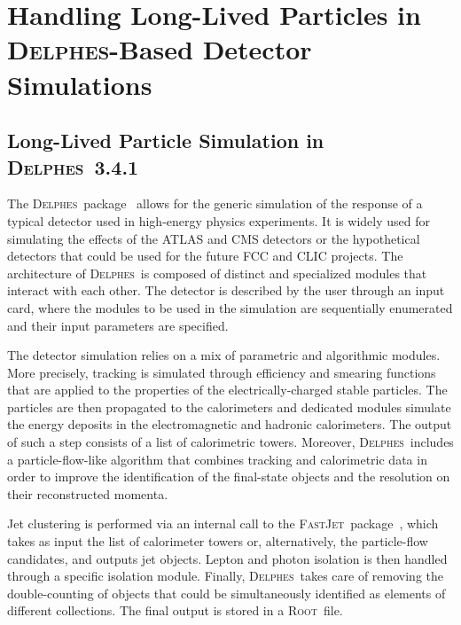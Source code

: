 
\newcommand{\MG}{\textsc{MadGraph}~5\_aMC@NLO}
\newcommand{\PY}{\textsc{Pythia}~8}
\newcommand{\MA}{\textsc{MadAnalysis}~5}
\newcommand{\MW}{\textsc{MadWidth}}
\newcommand{\MAnorm}{{MadAnalysis}~5}
\newcommand{\FJ}{\textsc{FastJet}}
\newcommand{\DEL}{\textsc{Delphes}}
\newcommand{\ROOT}{\textsc{Root}}

\section{Handling Long-Lived Particles in \DEL-Based Detector Simulations}
\label{sec:ch5-recastingDelphes}

\subsection{Long-Lived Particle Simulation in \DEL~3.4.1}

The \DEL\ package~\cite{deFavereau:2013fsa} allows for the generic simulation of
the response of a typical detector used in high-energy physics experiments. It
is widely used for simulating the effects of the ATLAS and CMS detectors or the
hypothetical detectors that could be used for the future FCC and CLIC projects.
The architecture of \DEL\ is composed of distinct
and specialized modules that interact with each other. The detector is described
by the user through an input card, where the modules to be used in the
simulation are sequentially enumerated and their input parameters are specified.

The detector simulation relies on a mix of parametric and algorithmic
modules. More precisely, tracking is simulated through efficiency and smearing
functions that are applied to the properties of the electrically-charged stable
particles. The particles are then propagated to the calorimeters and dedicated
modules simulate the energy deposits in the electromagnetic and hadronic
calorimeters. The output of such a step consists of a list of calorimetric towers.
Moreover, \DEL\ includes a particle-flow-like
algorithm that combines tracking and calorimetric data in order to
improve the identification of the final-state objects and the resolution on
their reconstructed momenta.

Jet clustering is performed via an internal call to the \FJ\
package~\cite{Cacciari:2011ma}, which takes as input the
list of calorimeter towers or, alternatively, the particle-flow candidates, and
outputs jet objects. Lepton and photon isolation is then handled through a
specific isolation module. Finally, \DEL\ takes care of removing the
double-counting of objects that could be simultaneously identified as elements of
different collections. The final output is stored in a \ROOT\ file.

